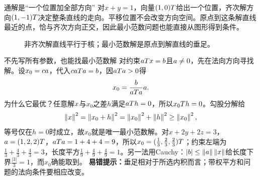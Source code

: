\begin{insight}{通解是“一个位置加全部方向”}
对$x+y=1$，向量$(1,0)T$给出一个位置，齐次解方向$(1,-1)T$决定整条直线的走向。平移位置不会改变方向空间。原点到这条解直线最近的点，恰与齐次方向正交，因此最小范数问题也能直接从图形得到条件。
\end{insight}
\begin{figure}[H]\centering
{}
\caption{非齐次解直线平行于核；最小范数解是原点到解直线的垂足。}\label{fig:affine-minnorm}
\end{figure}
\begin{clevertrick}{不先写所有参数，也能找最小范数解}
对约束$aTx=b$且$a\ne0$，先在法向方向寻找解。设$x_0=ca$，代入$caTa=b$，因$aTa>0$得
\[x_0=\dfrac{b}{aTa}a.\]
为什么它最优？任意解$x$与$x_0$之差$h$满足$aT h=0$，所以$x_0T h=0$。勾股分解给
\[\left\lVert x\right\rVert^2=\left\lVert x_0+h\right\rVert^2=\left\lVert x_0\right\rVert^2+\left\lVert h\right\rVert^2\ge\left\lVert x_0\right\rVert^2,\]
等号仅在$h=0$时成立，故$x_0$就是唯一最小范数解。对$x+2y+2z=3$，$a=(1,2,2)T$，$aTa=1+4+4=9$，所以$x_0=(\frac{1}{3},\frac{2}{3},\frac{2}{3})T$；约束左端为$\frac{1}{3}+\frac{4}{3}+\frac{4}{3}=3$，长度平方$\frac{1}{9}+\frac{4}{9}+\frac{4}{9}=1$。另一法用Cauchy：$|b|\le\left\lVert a\right\rVert\left\lVert x\right\rVert$给长度下界$\frac{|3|}{3}=1$，而$x_0$确能取到。
\textbf{易错提示：}垂足相对于所选内积而言；带权平方和问题的法向条件要相应改变。
\end{clevertrick}
